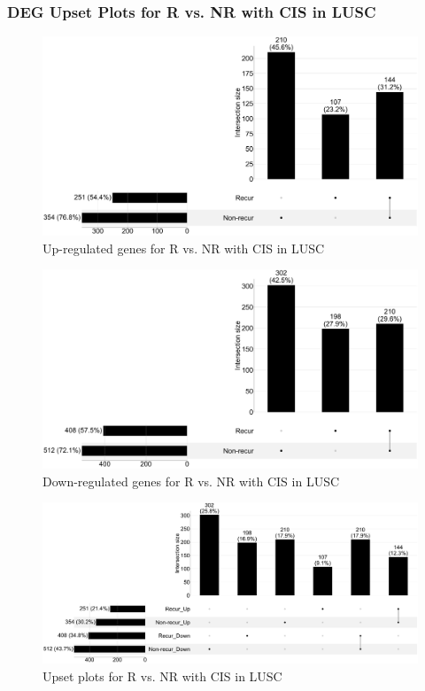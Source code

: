 \documentclass{beamer}
\begin{document}
    \begin{frame}[allowframebreaks]
        \frametitle{DEG Upset Plots for R vs. NR with CIS in  LUSC}

        \begin{figure}
            \includegraphics[width=0.8 \linewidth]{figures/DEG/Pair-Venn/STAR.FPKM.SQC-CIS.Recur-Nonrecur.Up.venn.pdf}
            \caption{Up-regulated genes for R vs. NR with CIS in LUSC}
        \end{figure}

        \begin{figure}
            \includegraphics[width=0.8 \linewidth]{figures/DEG/Pair-Venn/STAR.FPKM.SQC-CIS.Recur-Nonrecur.Down.venn.pdf}
            \caption{Down-regulated genes for R vs. NR with CIS in LUSC}
        \end{figure}

        \begin{figure}
            \includegraphics[width=0.8 \linewidth]{figures/DEG/Pair-Venn/STAR.FPKM.SQC-CIS.Recur-Nonrecur.venn.pdf}
            \caption{Upset plots for R vs. NR with CIS in LUSC}
        \end{figure}
    \end{frame}
\end{document}
